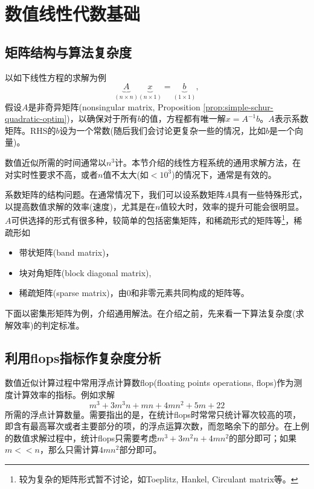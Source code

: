 
\section{数值线性代数基础}
\label{sec:numlin}

\subsection{矩阵结构与算法复杂度}
\label{sec:numlin-matrix-structure-algorithm-complexity}

以如下线性方程的求解为例
\begin{equation}
  \label{eq:numlin-matrix-example}
  \underbrace{A}_{\left(n \times n \right)}
  \underbrace{x}_{\left( n \times 1 \right)}
  = \underbrace{b}_{\left( 1 \times 1 \right)},
\end{equation}
假设$A$是非奇异矩阵(nonsingular matrix, Proposition \ref{prop:simple-schur-quadratic-optim})，以确保对于所有$b$的值，方程都有唯一解$x = A^{-1} b$。$A$表示系数矩阵。RHS的$b$设为一个常数(随后我们会讨论更复杂一些的情况，比如$b$是一个向量)。

数值近似所需的时间通常以$n^{3}$计。本节介绍的线性方程系统的通用求解方法，在对实时性要求不高，或者$n$值不太大(如$<10^{3}$)的情况下，通常是有效的。

系数矩阵的结构问题。在通常情况下，我们可以设系数矩阵$A$具有一些特殊形式，以提高数值求解的效率(速度)，尤其是在$n$值较大时，效率的提升可能会很明显。$A$可供选择的形式有很多种，较简单的包括密集矩阵，和稀疏形式的矩阵等\footnote{较为复杂的矩阵形式暂不讨论，如Toeplitz, Hankel, Circulant matrix等。}，稀疏形如
\begin{itemize}
  \item 带状矩阵(band matrix)，
  \item 块对角矩阵(block diagonal matrix),
  \item 稀疏矩阵(sparse matrix)，由$0$和非零元素共同构成的矩阵等。
\end{itemize}

下面以密集形矩阵为例，介绍通用解法。在介绍之前，先来看一下算法复杂度(求解效率)的判定标准。

\subsection*{利用flops指标作复杂度分析}
数值近似计算过程中常用浮点计算数flop(floating points operations, flops)作为测度计算效率的指标。例如求解
\begin{equation*}
  m^{3} + 3 m^{3} n + mn + 4 m n^{2} + 5m + 22
\end{equation*}
所需的浮点计算数量。需要指出的是，在统计flops时常常只统计幂次较高的项，即含有最高幂次或者主要部分的项，的浮点运算次数，而忽略余下的部分。在上例的数值求解过程中，统计flops只需要考虑$m^{3} + 3 m^{2} n + 4 m n^{2}$的部分即可；如果$m << n$，那么只需计算$4 m n^{2}$部分即可。

